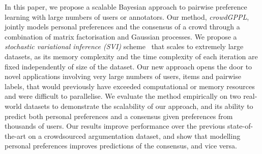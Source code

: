 In this paper, we propose a scalable Bayesian approach to pairwise preference learning with 
large numbers of users or annotators. %
Our method, \emph{crowdGPPL},
 jointly models personal preferences and the consensus of a crowd through a combination of
matrix factorisation and Gaussian processes. 
We propose a \emph{stochastic variational inference (SVI)} scheme~\citep{hoffman2013stochastic}
that scales to extremely large datasets, as its
memory complexity and the time complexity of each iteration are 
fixed independently of size of the dataset.
Our new approach opens the door to novel applications involving very large numbers of users, items and pairwise labels,
that would previously have exceeded computational or memory resources and were difficult to parallelise.
We evaluate the method empirically on two real-world datasets to demonstrate 
the scalability of our approach,
and its ability to predict both personal preferences and a consensus given 
preferences from thousands of users.
Our results improve performance over the previous state-of-the-art \citep{simpson2018finding} on a crowdsourced argumentation dataset,
and show that modelling personal preferences improves predictions of the consensus, and vice versa.

